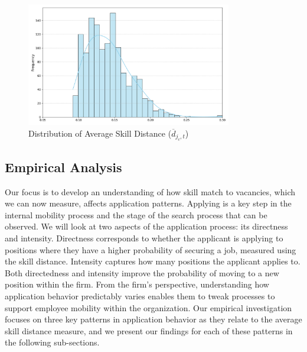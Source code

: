 \documentclass[12pt]{article}
\begin{document}
\begin{figure}[h]
    \begin{center}
        \begin{minipage}{\textwidth}
            \centering
            \includegraphics[width=0.8\textwidth,height=0.4\textheight]{new_img/histogram_prosp.png}
            \caption{Distribution of Average Skill Distance (\(\overline{d}_{j_c, t}\))}
            \label{fig:s_dist_hist}
        \end{minipage}
    \end{center}
\end{figure}




\subsection{Empirical Analysis}

Our focus is to develop an understanding of how skill match to vacancies, which we can now measure, affects application patterns. Applying is a key step in the internal mobility process and the stage of the search process that can be observed. We will look at two aspects of the application process: its directness and intensity. Directness corresponds to whether the applicant is applying to positions where they have a higher probability of securing a job, measured using the skill distance. Intensity captures how many positions the applicant applies to. Both directedness and intensity improve the probability of moving to a new position within the firm. From the firm's perspective, understanding how application behavior predictably varies enables them to tweak processes to support employee mobility within the organization. Our empirical investigation focuses on three key patterns in application behavior as they relate to the average skill distance measure, and we present our findings for each of these patterns in the following sub-sections.
\end{document}
